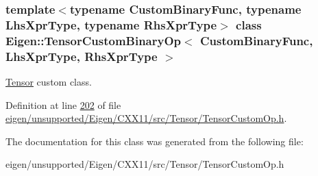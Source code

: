 \subsubsection*{template$<$typename Custom\+Binary\+Func, typename Lhs\+Xpr\+Type, typename Rhs\+Xpr\+Type$>$\newline
class Eigen\+::\+Tensor\+Custom\+Binary\+Op$<$ Custom\+Binary\+Func, Lhs\+Xpr\+Type, Rhs\+Xpr\+Type $>$}

\hyperlink{class_eigen_1_1_tensor}{Tensor} custom class. 

Definition at line \hyperlink{eigen_2unsupported_2_eigen_2_c_x_x11_2src_2_tensor_2_tensor_custom_op_8h_source_l00202}{202} of file \hyperlink{eigen_2unsupported_2_eigen_2_c_x_x11_2src_2_tensor_2_tensor_custom_op_8h_source}{eigen/unsupported/\+Eigen/\+C\+X\+X11/src/\+Tensor/\+Tensor\+Custom\+Op.\+h}.



The documentation for this class was generated from the following file\+:\begin{DoxyCompactItemize}
\item 
eigen/unsupported/\+Eigen/\+C\+X\+X11/src/\+Tensor/\+Tensor\+Custom\+Op.\+h\end{DoxyCompactItemize}
